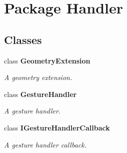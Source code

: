 \section{Package Handler}
\label{namespace_handler}
\subsection*{Classes}
\begin{DoxyCompactItemize}
\item 
class {\bf Geometry\-Extension}
\begin{DoxyCompactList}\small\item\em A geometry extension. \end{DoxyCompactList}\item 
class {\bf Gesture\-Handler}
\begin{DoxyCompactList}\small\item\em A gesture handler. \end{DoxyCompactList}\item 
class {\bf I\-Gesture\-Handler\-Callback}
\begin{DoxyCompactList}\small\item\em A gesture handler callback. \end{DoxyCompactList}\end{DoxyCompactItemize}
